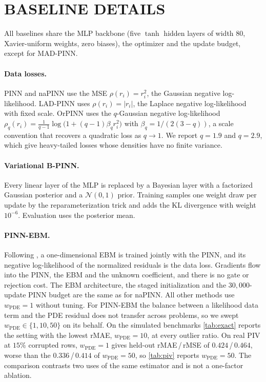 \documentclass[twoside]{article}
\newcommand{\wpde}{w_{\mathrm{PDE}}}
\begin{document}
\section{BASELINE DETAILS}
\label{app:baselines}

All baselines share the MLP backbone (five $\tanh$ hidden layers of width $80$,
Xavier-uniform weights, zero biases), the optimizer and the update budget,
except for MAD-PINN.

\paragraph{Data losses.} PINN and naPINN use the MSE $\rho(r_i) = r_i^2$, the
Gaussian negative log-likelihood. LAD-PINN uses $\rho(r_i) =
|r_i|$, the Laplace negative log-likelihood with fixed scale. OrPINN \citep{Duarte2025} uses the
$q$-Gaussian negative log-likelihood
$\rho_q(r_i) = \frac{1}{q-1}\log\!\big(1 + (q-1)\beta_q r_i^2\big)$ with
$\beta_q = 1/(2(3-q))$, a scale convention that recovers a quadratic loss as
$q \to 1$. We report $q = 1.9$ and $q = 2.9$, which give heavy-tailed losses
whose densities have no finite variance.

\paragraph{Variational B-PINN.} Every linear layer of the MLP is replaced by a
Bayesian layer with a factorized Gaussian posterior and a $\mathcal{N}(0,1)$
prior. Training samples one weight draw per update by the reparameterization
trick and adds the KL divergence with weight $10^{-6}$. Evaluation uses the
posterior mean.

\paragraph{PINN-EBM.}
\label{app:pinnebm}
Following \citet{Pilar2024}, a one-dimensional EBM is trained jointly with the
PINN, and its negative log-likelihood of the normalized residuals is the data
loss. Gradients flow into the PINN, the EBM and the unknown coefficient, and
there is no gate or rejection cost. The EBM architecture, the staged
initialization and the $30{,}000$-update PINN budget are the same as for
naPINN. All other methods use $\wpde = 1$ without tuning. For PINN-EBM the
balance between a likelihood data term and the PDE residual does not transfer
across problems, so we swept $\wpde \in \{1, 10, 50\}$ on its behalf. On the
simulated benchmarks \cref{tab:exact} reports the setting with the lowest
rMAE, $\wpde = 10$, at every outlier ratio. On real PIV at $15\%$ corrupted rows, $\wpde = 1$ gives
held-out rMAE\,/\,rMSE of $0.424$\,/\,$0.464$, worse than the
$0.336$\,/\,$0.414$ of $\wpde = 50$, so \cref{tab:piv} reports $\wpde = 50$. The
comparison contrasts two uses of the same estimator and is not a one-factor
ablation.
\end{document}
